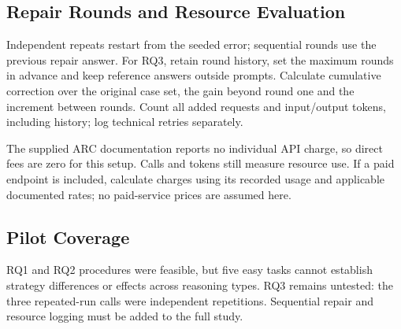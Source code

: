 \documentclass[11pt,letterpaper]{article}
\begin{document}
\subsection*{Repair Rounds and Resource Evaluation}
Independent repeats restart from the seeded error; sequential rounds use the previous repair answer. For RQ3, retain round history, set the maximum rounds in advance and keep reference answers outside prompts. Calculate cumulative correction over the original case set, the gain beyond round one and the increment between rounds. Count all added requests and input/output tokens, including history; log technical retries separately.

The supplied ARC documentation reports no individual API charge, so direct fees are zero for this setup. Calls and tokens still measure resource use. If a paid endpoint is included, calculate charges using its recorded usage and applicable documented rates; no paid-service prices are assumed here.

\subsection*{Pilot Coverage}
RQ1 and RQ2 procedures were feasible, but five easy tasks cannot establish strategy differences or effects across reasoning types. RQ3 remains untested: the three repeated-run calls were independent repetitions. Sequential repair and resource logging must be added to the full study.

\end{document}
